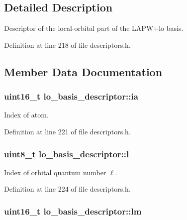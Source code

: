 \subsection{Detailed Description}
Descriptor of the local-\/orbital part of the L\+A\+P\+W+lo basis. 

Definition at line 218 of file descriptors.\+h.



\subsection{Member Data Documentation}
\hypertarget{structlo__basis__descriptor_adadd7e7ba8c43cc00d1a23d314b322c2}{}
\subsubsection[{ia}]{\setlength{\rightskip}{0pt plus 5cm}uint16\+\_\+t lo\+\_\+basis\+\_\+descriptor\+::ia}\label{structlo__basis__descriptor_adadd7e7ba8c43cc00d1a23d314b322c2}


Index of atom. 



Definition at line 221 of file descriptors.\+h.

\hypertarget{structlo__basis__descriptor_a8e71167cce641d248983f6632958295c}{}
\subsubsection[{l}]{\setlength{\rightskip}{0pt plus 5cm}uint8\+\_\+t lo\+\_\+basis\+\_\+descriptor\+::l}\label{structlo__basis__descriptor_a8e71167cce641d248983f6632958295c}


Index of orbital quantum number $ \ell $. 



Definition at line 224 of file descriptors.\+h.

\hypertarget{structlo__basis__descriptor_ae2fb8ed488b4b69f0785c05d2c798c4e}{}
\subsubsection[{lm}]{\setlength{\rightskip}{0pt plus 5cm}uint16\+\_\+t lo\+\_\+basis\+\_\+descriptor\+::lm}\label{structlo__basis__descriptor_ae2fb8ed488b4b69f0785c05d2c798c4e}


